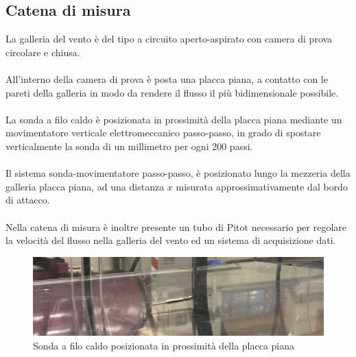 \subsection{Catena di misura}
La galleria del vento è del tipo a circuito aperto-aspirato con camera di prova circolare e chiusa.\\\\
All'interno della camera di prova è posta una placca piana, a contatto con le pareti della galleria in modo da rendere il flusso il più bidimensionale possibile.\\\\
La sonda a filo caldo è posizionata in prossimità della placca piana mediante un movimentatore verticale elettromeccanico passo-passo, in grado di spostare verticalmente la sonda di un millimetro per ogni 200 passi.\\\\
Il sistema sonda-movimentatore passo-passo, è posizionato lungo la mezzeria della galleria placca piana, ad una distanza $x$ misurata approssimativamente dal bordo di attacco.\\\\
Nella catena di misura è inoltre presente un tubo di Pitot necessario per regolare la velocità del flusso nella galleria del vento ed un sistema di acquisizione dati.
\begin{figure}[H]
    \centering
    \includegraphics[width=.8\textwidth]{images/9/sonda.jpg}
    \caption{Sonda a filo caldo posizionata in prossimità della placca piana}
\end{figure}

